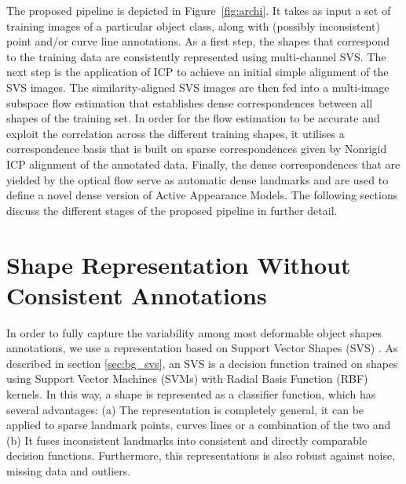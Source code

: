 The proposed pipeline is depicted in Figure~\ref{fig:archi}. It takes as input a set of training images of a particular object class, along with (possibly inconsistent) point and/or curve line annotations. 
As a first step, the shapes that correspond to the training data are consistently represented using multi-channel SVS. 
The next step is the application of ICP to achieve an initial simple alignment of the SVS images. 
The similarity-aligned SVS images are then fed into a multi-image subspace flow estimation that establishes dense correspondences between all shapes of the training set. In order for the flow estimation to be accurate and exploit the correlation across the different training shapes, it utilises a correspondence basis that is built on sparse correspondences given by Nonrigid ICP alignment of the annotated data. Finally, the dense correspondences that are yielded by the optical flow serve as automatic dense landmarks and are used to define a novel dense version of Active Appearance Models. The following sections discuss the different stages of the proposed pipeline in further detail.

\section{Shape Representation Without Consistent Annotations}
\label{sec:svs}

In order to fully capture the variability among most deformable object shapes annotations, we use a representation based on Support Vector Shapes (SVS) \cite{Nguyen2013}. As described in section \ref{sec:bg_svs}, an SVS is a decision function trained on shapes using Support Vector Machines (SVMs) with  Radial Basis Function (RBF) kernels. In this way, a shape is represented as a classifier function, which has several advantages: (a) The representation is completely general, \eg it can be applied to sparse landmark points, curves lines or a combination of the two and (b) It fuses inconsistent landmarks into consistent and directly comparable decision functions. Furthermore, this representations is also robust against noise, missing data and outliers.

